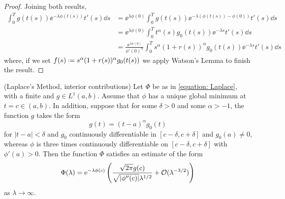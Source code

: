 \begin{proof}
	Joining both results,
		\begin{align}
			\int_{0}^{T} g(t(s)) \ee^{-\lambda \phi(t(s))} t'(s) \dd s & = \ee^{\lambda \phi(0)} \int_{0}^{T} g(t(s)) \ee^{-\lambda (\phi(t(s)) - \phi(0))} t'(s) \dd s \\
			& = \ee^{\lambda \phi(0)} \int_{0}^{T} t^\alpha(s) g_0(t(s)) \ee^{-\lambda s} t'(s) \dd s \\
			& = \frac{\ee^{\lambda \phi(0)}}{\phi'(0)^\alpha} \int_{0}^{T} s^\alpha (1+r(s))^\alpha g_0(t(s)) \ee^{-\lambda s} t'(s) \dd s			
		\end{align}
	where, if we set $f(s) \deff s^\alpha (1+r(s))^\alpha g_0(t(s))$ we apply Watson's Lemma to finish the result. 
\end{proof}

\begin{teorema} 	\label{prop: (Laplace's Method, interior contributions)}
	(Laplace's Method, interior contributions) Let $\Phi$ be as in \eqref{equation: Laplace}, with a finite and $g \in L^1(a,b)$. Assume that $\phi$ has a unique global minimum at $t=c \in (a,b)$. In addition, suppose that for some $\delta > 0$ and some $\alpha > -1$, the function $g$ takes the form
	\begin{equation}
		g(t) = (t-a)^{\alpha} g_0(t)
	\end{equation}
	for $|t-a| < \delta$ and $g_0$ continuously differentiable in $[c-\delta, c+\delta]$ and $g_0(a) \neq 0$, whereas $\phi$ is three times continuously differentiable on $[c-\delta, c+\delta]$ with $\phi'(a) > 0$. Then the function $\Phi$ satisfies an estimate of the form
	\begin{equation}
		\Phi(\lambda) = \operatorname{e}^{-\lambda \phi(c)} \left( \frac{\sqrt{2\pi} g(c)}{\sqrt{|\phi''(c)|}\lambda^{1/2}} + \mathcal{O}(\lambda^{-3/2})\right)
	\end{equation}
	as $\lambda \rightarrow \infty$.
\end{teorema}

